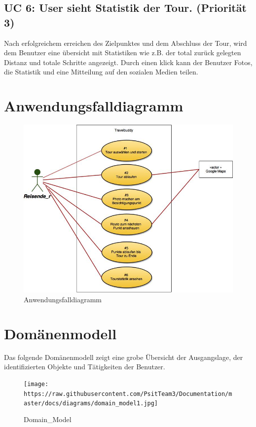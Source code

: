 \documentclass[ngerman,]{article}
\begin{document}
\subsection{UC 6: User sieht Statistik der Tour. (Priorität
3)}\label{uc-6-user-sieht-statistik-der-tour.-priorituxe4t-3}

Nach erfolgreichem erreichen des Zielpunktes und dem Abschluss der Tour,
wird dem Benutzer eine übersicht mit Statistiken wie z.B. der total
zurück gelegten Distanz und totale Schritte angezeigt. Durch einen klick
kann der Benutzer Fotos, die Statistik und eine Mitteilung auf den
sozialen Medien teilen.

\section{Anwendungsfalldiagramm}\label{anwendungsfalldiagramm}

\begin{figure}
\centering
\includegraphics{docs/diagrams/Anwendungsfalldiagramm.jpg}
\caption{Anwendungsfalldiagramm}
\end{figure}

\section{Domänenmodell}\label{domuxe4nenmodell}

Das folgende Domänenmodell zeigt eine grobe Übersicht der Ausgangslage,
der identifizierten Objekte und Tätigkeiten der Benutzer.

\begin{figure}
\centering
\texttt{[image: https://raw.githubusercontent.com/PsitTeam3/Documentation/master/docs/diagrams/domain\_model1.jpg]}
\caption{Domain\_Model}
\end{figure}
\end{document}
